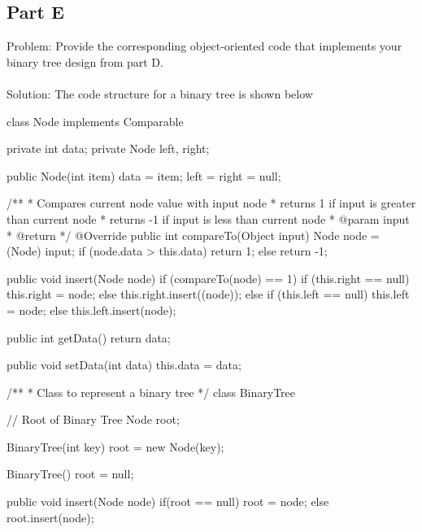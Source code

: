 \documentclass{article}
\begin{document}
\subsection*{Part E}
Problem: Provide the corresponding object-oriented code that implements your binary tree design from part D. \\\\
Solution: The code structure for a binary tree is shown below
\begin{spverbatim}
class Node implements Comparable {
	
    private int data;
    private Node left, right;
	
    public Node(int item) {
        data = item;
        left = right = null;
    }
	
    /**
    * Compares current node value with input node
    * returns 1 if input is greater than current node
    * returns -1 if input is less than current node
    * @param input
    * @return 
    */
    @Override
    public int compareTo(Object input) {
        Node node = (Node) input;
        if (node.data > this.data) {
            return 1;
        }
        else {
            return -1;
        }
    }
	
    public void insert(Node node) {
        if (compareTo(node) == 1) {
            if (this.right == null) {
                 this.right = node;
            }
            else {
                 this.right.insert((node));
            }
        } else {
            if (this.left == null) {
                this.left = node;
            }
            else {
                this.left.insert(node);
            }
        }
    }
	
    public int getData() {
        return data;
    }
	
    public void setData(int data) {
        this.data = data;
    }
}
\end{spverbatim}

\newpage
\begin{spverbatim}
/**
* Class to represent a binary tree
*/
class BinaryTree {
	
    // Root of Binary Tree 
    Node root;
	
    BinaryTree(int key) {
        root = new Node(key);
    }
	
    BinaryTree() {
        root = null;
    }
	
	
    public void insert(Node node){
        if(root == null){
            root = node;
        }
        else{
            root.insert(node);
        }
    }
}
\end{spverbatim}
\newpage
\end{document}
